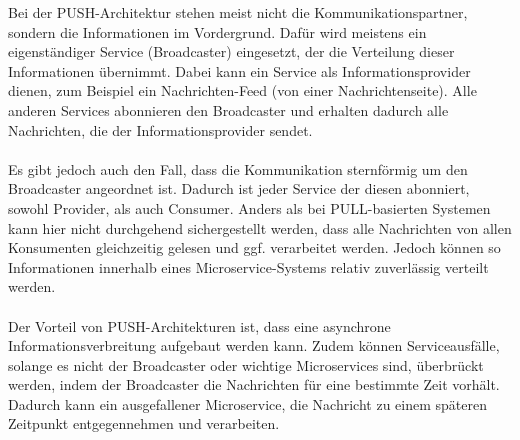 Bei der PUSH-Architektur stehen meist nicht die Kommunikationspartner, sondern die Informationen im Vordergrund. Dafür wird meistens ein eigenständiger Service (Broadcaster) eingesetzt, der die Verteilung dieser Informationen übernimmt. Dabei kann ein Service als Informationsprovider dienen, zum Beispiel ein Nachrichten-Feed (von einer Nachrichtenseite). Alle anderen Services abonnieren den Broadcaster und erhalten dadurch alle Nachrichten, die der Informationsprovider sendet.
\\\\
Es gibt jedoch auch den Fall, dass die Kommunikation sternförmig um den Broadcaster angeordnet ist. Dadurch ist jeder Service der diesen abonniert, sowohl Provider, als auch Consumer. Anders als bei PULL-basierten Systemen kann hier nicht durchgehend sichergestellt werden, dass alle Nachrichten von allen Konsumenten gleichzeitig gelesen und ggf. verarbeitet werden. Jedoch können so Informationen innerhalb eines Microservice-Systems relativ zuverlässig verteilt werden.
\\\\
Der Vorteil von PUSH-Architekturen ist, dass eine asynchrone Informationsverbreitung aufgebaut werden kann. Zudem können Serviceausfälle, solange es nicht der Broadcaster oder wichtige Microservices sind, überbrückt werden, indem der Broadcaster die Nachrichten für eine bestimmte Zeit vorhält. Dadurch kann ein ausgefallener Microservice, die Nachricht zu einem späteren Zeitpunkt entgegennehmen und verarbeiten.